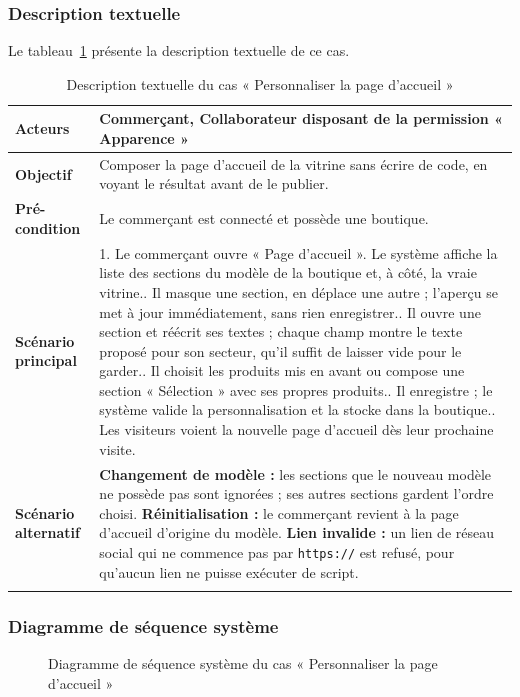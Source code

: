 \subsubsection{Description textuelle}
Le tableau~\ref{tab:uc-theme} présente la description textuelle de ce cas.
\renewcommand{\arraystretch}{1.5}
\begin{longtable}{|p{4cm}|p{11cm}|}
\hline
\textbf{Acteurs} & Commerçant, Collaborateur disposant de la permission « Apparence » \\
\hline
\textbf{Objectif} & Composer la page d'accueil de la vitrine sans écrire de code, en voyant le résultat avant de le publier. \\
\hline
\textbf{Pré-condition} & Le commerçant est connecté et possède une boutique. \\
\hline
\textbf{Scénario principal} &
1. Le commerçant ouvre « Page d'accueil ». Le système affiche la liste des sections du modèle de la boutique et, à côté, la vraie vitrine.\newline
2. Il masque une section, en déplace une autre ; l'aperçu se met à jour immédiatement, sans rien enregistrer.\newline
3. Il ouvre une section et réécrit ses textes ; chaque champ montre le texte proposé pour son secteur, qu'il suffit de laisser vide pour le garder.\newline
4. Il choisit les produits mis en avant ou compose une section « Sélection » avec ses propres produits.\newline
5. Il enregistre ; le système valide la personnalisation et la stocke dans la boutique.\newline
6. Les visiteurs voient la nouvelle page d'accueil dès leur prochaine visite. \\
\hline
\textbf{Scénario alternatif} &
\textbf{Changement de modèle :} les sections que le nouveau modèle ne possède pas sont ignorées ; ses autres sections gardent l'ordre choisi.\newline
\textbf{Réinitialisation :} le commerçant revient à la page d'accueil d'origine du modèle.\newline
\textbf{Lien invalide :} un lien de réseau social qui ne commence pas par \texttt{https://} est refusé, pour qu'aucun lien ne puisse exécuter de script. \\
\hline
\caption{Description textuelle du cas « Personnaliser la page d'accueil »}
\label{tab:uc-theme}
\end{longtable}

\subsubsection{Diagramme de séquence système}
\begin{figure}[H]
    \centering
    \caption{Diagramme de séquence système du cas « Personnaliser la page d'accueil »}
    \label{fig:dss-theme}
\end{figure}

